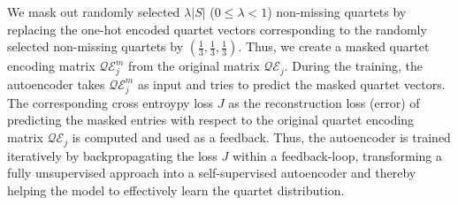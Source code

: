We mask out randomly selected $\lambda|S|$ ($0 \le \lambda < 1$) non-missing quartets by replacing the one-hot encoded quartet vectors corresponding to the randomly selected non-missing quartets by $(\frac{1}{3},\frac{1}{3},\frac{1}{3})$.  Thus, we create a masked quartet encoding matrix $\mathcal{QE}_j^m$ from the original matrix $\mathcal{QE}_j$. During the training, the autoencoder takes $\mathcal{QE}_j^m$ as input and tries to predict the masked quartet vectors. The corresponding cross entroypy loss $J$ as the reconstruction loss (error) of predicting the masked entries with respect to the original quartet encoding matrix $\mathcal{QE}_j$ is computed and used as a feedback. Thus, the autoencoder is trained iteratively by backpropagating the loss $J$ within a feedback-loop, transforming a fully unsupervised approach into a self-supervised autoencoder and thereby helping the model to effectively learn the quartet distribution. %


